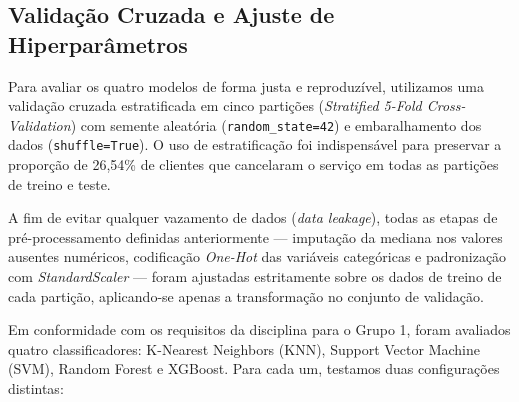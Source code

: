 
\subsection{Validação Cruzada e Ajuste de Hiperparâmetros}

Para avaliar os quatro modelos de forma justa e reproduzível, utilizamos uma validação cruzada estratificada em cinco partições (\textit{Stratified 5-Fold Cross-Validation}) com semente aleatória (\texttt{random\_state=42}) e embaralhamento dos dados (\texttt{shuffle=True}). O uso de estratificação foi indispensável para preservar a proporção de 26,54\% de clientes que cancelaram o serviço em todas as partições de treino e teste.

A fim de evitar qualquer vazamento de dados (\textit{data leakage}), todas as etapas de pré-processamento definidas anteriormente — imputação da mediana nos valores ausentes numéricos, codificação \textit{One-Hot} das variáveis categóricas e padronização com \textit{StandardScaler} — foram ajustadas estritamente sobre os dados de treino de cada partição, aplicando-se apenas a transformação no conjunto de validação.

Em conformidade com os requisitos da disciplina para o Grupo 1, foram avaliados quatro classificadores: K-Nearest Neighbors (KNN), Support Vector Machine (SVM), Random Forest e XGBoost. Para cada um, testamos duas configurações distintas:

